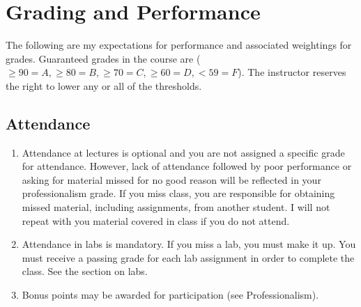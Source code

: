 \documentclass[10pt]{article}
\begin{document}
\section{Grading and Performance}
The following are my expectations for performance and associated weightings for grades. Guaranteed grades in the course are ($\geq 90 = A,\geq 80 = B, \geq 70 = C, \geq 60 = D, < 59 = F$). The instructor reserves the right to lower any or all of the thresholds. 


\subsection{Attendance}
\begin{enumerate}
\item Attendance at lectures is optional and you are not assigned a specific grade for attendance. However, lack of attendance followed by poor performance or asking for material missed for no good reason will be reflected in your professionalism grade. If you miss class, you are responsible for obtaining missed material, including assignments, from another student. I will not repeat with you material covered in class if you do not attend.
\item Attendance in labs is mandatory.  If you miss a lab, you must make it up.  You must receive a passing grade for each lab assignment in order to complete the class.  See the section on labs.
\item Bonus points may be awarded for participation (see Professionalism).
\end{enumerate}


\end{document}

